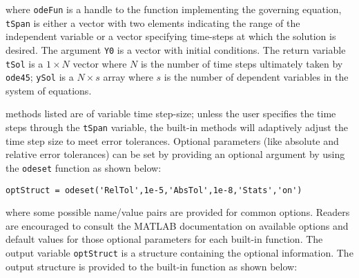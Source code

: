 \vspace{0.25cm}


\noindent where \lstinline[style=myMatlab]{odeFun} is a handle to the function implementing the governing equation, \lstinline[style=myMatlab]{tSpan} is either a vector with two elements indicating the range of the independent variable or a vector specifying time-steps at which the solution is desired. The argument \lstinline[style=myMatlab]{Y0} is a vector with initial conditions.  The return variable \lstinline[style=myMatlab]{tSol} is a $1 \times N$ vector where $N$ is the number of time steps ultimately taken by \lstinline[style=myMatlab]{ode45}; \lstinline[style=myMatlab]{ySol} is a $N \times s$ array where $s$ is the number of dependent variables in the system of equations.

 methods listed are of variable time step-size; unless the user specifies the time steps through the \lstinline[style=myMatlab]{tSpan} variable, the built-in methods will adaptively adjust the time step size to meet error tolerances.  Optional parameters (like absolute and relative error tolerances) can be set by providing an optional argument by using the \lstinline[style=myMatlab]{odeset} function as shown below:

\vspace{0.25cm}

\noindent\parbox{\textwidth}{
\centering
\lstinline[style=myMatlab]{optStruct = odeset('RelTol',1e-5,'AbsTol',1e-8,'Stats','on')} 

}

\vspace{0.25cm}

\noindent where some possible name/value pairs are provided for common options.  Readers are encouraged to consult the MATLAB documentation on available options and default values for those optional parameters for each built-in function.  The output variable \lstinline[style=myMatlab]{optStruct} is a structure containing the optional information.  The output structure is provided to the built-in function as shown below:

\vspace{0.25cm}

